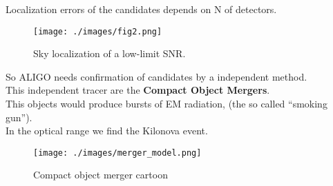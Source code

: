 \documentclass[10pt]{beamer}
\begin{document}
\begin{frame}
Localization errors of the candidates depends on N of detectors.
\begin{figure}%
 \centering
 \texttt{[image: ./images/fig2.png]}
 \caption{\scriptsize{Sky localization of a low-limit SNR.}} 
\end{figure}
\end{frame}
\begin{frame}
So ALIGO needs confirmation of candidates by a independent method.\\
\pause
This independent tracer are the \textbf{Compact Object Mergers}.\\
This objects would produce bursts of EM radiation,
(the so called ``smoking gun'').\\
In the optical range we find the Kilonova event.
\begin{figure}
 \texttt{[image: ./images/merger\_model.png]}
 \caption{\scriptsize{Compact object merger cartoon}}
\end{figure}
\end{frame}
\end{document}
